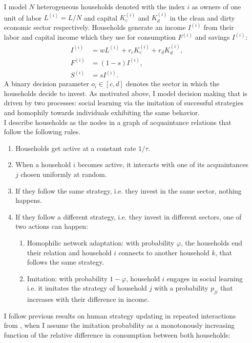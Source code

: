 I model $N$ heterogeneous households denoted with the index $i$ as owners of one unit of labor $L^{(i)} = L/N$ and capital $K_c^{(i)}$ and $K_d^{(i)}$ in the clean and dirty economic sector respectively.
Households generate an income $I^{(i)}$ from their labor and capital income which they use for consumption $F^{(i)}$ and savings $I^{(i)}$:
\begin{align}
	I^{(i)} &= w L^{(i)} + r_c K_c^{(i)} + r_d K_d^{(i)}, \label{eq:approx_hi} \\
	F^{(i)} &= (1-s) I^{(i)}, \label{eq:approx_c} \\
	S^{(i)} &= s I^{(i)}. \label{eq:approx_s}
\end{align}
A binary decision parameter $o_i \in [c,d]$ denotes the sector in which the households decide to invest. As motivated above, I model decision making that is driven by two processes: social learning via the imitation of successful strategies and homophily towards individuals exhibiting the same behavior. \\
I describe households as the nodes in a graph of acquaintance relations that follow the following rules. 
\begin{enumerate}
  \item Households get active at a constant rate $1/\tau$. \label{r1}
        \item When a household $i$ becomes active, it interacts with one of its acquaintances $j$ chosen uniformly at random. 
        \item If they follow the same strategy, i.e. they invest in the same sector, nothing happens. 
        \item If they follow a different strategy, i.e. they invest in different sectors, one of two actions can happen:
        \begin{enumerate}
                \item Homophilic network adaptation: with probability $\varphi$, the households end their relation and household $i$ connects to another household $k$, that follows the same strategy. 
                \item Imitation: with probability $1-\varphi$, household $i$ engages in social learning i.e. it imitates the strategy of household $j$ with a probability $p_{ji}$ that increases with their difference in income. \label{rn}
        \end{enumerate}
\end{enumerate}
I follow previous results on human strategy updating in repeated interactions from \cite{Traulsen2010}, when I assume the imitation probability as a monotonously increasing function of the relative difference in consumption between both households:
